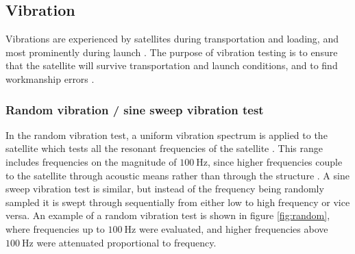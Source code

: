 \documentclass[a4paper,11pt]{article}
\begin{document}






\subsection{Vibration}
Vibrations are experienced by satellites during transportation and loading, and most prominently during launch \cite{brown_elements_2002}. The purpose of vibration testing is to ensure that the satellite will survive transportation and launch conditions, and to find workmanship errors \cite{brown_elements_2002,gordon2015benefits}.

\subsubsection{Random vibration / sine sweep vibration test}
In the random vibration test, a uniform vibration spectrum is applied to the satellite which tests all the resonant frequencies of the satellite \cite{nieto2019cubesat}. This range includes frequencies on the magnitude of $\SI{100}{\hertz}$, since higher frequencies couple to the satellite through acoustic means rather than through the structure \cite{gordon2015benefits}. A sine sweep vibration test is similar, but instead of the frequency being randomly sampled it is swept through sequentially from either low to high frequency or vice versa. An example of a random vibration test is shown in figure \ref{fig:random}, where frequencies up to $\SI{100}{\hertz}$ were evaluated, and higher frequencies above $\SI{100}{\hertz}$ were attenuated proportional to frequency.
\end{document}
